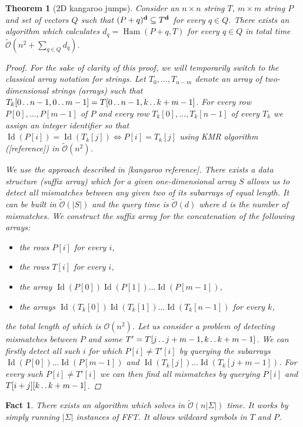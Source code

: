 \documentclass[11pt]{article}
\def\dd{\mathinner{.\,.}}
\renewcommand{\O}{\mathcal{O}}
\newcommand{\tO}{\tilde{\mathcal{O}}}
\DeclareMathOperator*{\Ham}{Ham}
\theoremstyle{plain}
\newtheorem{theorem}{Theorem}
\newtheorem{fact}{Fact}
\theoremstyle{definition}
\theoremstyle{remark}
\DeclareMathOperator*{\ID}{Id}
\begin{document}
\begin{theorem}[2D kangaroo jumps]\label{kangaroos}
	Consider an $n \times n$ string $T$, $m \times m$ string $P$ and set of vectors $Q$ such that $(P + q)^\mathbf{d} \subseteq T^\mathbf{d}$ for every $q \in Q$.
	There exists an algorithm which calculates $ d_q = \Ham(P + q, T) $ for every $q \in Q$ in total time $\tO(n^2 + \sum_{q \in Q} d_q)$.
	\begin{proof}
		For the sake of clarity of this proof, we will temporarily switch to the classical array notation for strings.
		Let $T_0, \dots, T_{n - m}$ denote an array of two-dimensional strings (arrays) such that $T_k[0 \dd n - 1, 0 \dd m - 1] = T[0 \dd n - 1, k \dd k + m - 1]$.
		For every row $P[0], \dots, P[m - 1]$ of $P$ and every row $T_k[0], \dots, T_k[n - 1]$ of every $T_k$ we assign an integer identifier so that $\ID(P[i]) = \ID(T_k[j]) \Leftrightarrow P[i] = T_k[j]$ using KMR algorithm ([reference]) in $\tO(n^2)$.
		
		We use the approach described in [kangaroo reference].
		There exists a data structure (suffix array) which for a given one-dimensional array $S$ allows us to detect all mismatches between any given two of its subarrays of equal length.
		It can be built in $\tO(|S|)$ and the query time is $\tO(d)$ where $d$ is the number of mismatches.
		We construct the suffix array for the concatenation of the following arrays:
		\begin{itemize}
			\item the rows $P[i]$ for every $i$,
			\item the rows $T[i]$ for every $i$,
			\item the array $\ID(P[0]) \ID(P[1]) \dots \ID(P[m - 1])$,
			\item the arrays $\ID(T_k[0]) \ID(T_k[1]) \dots \ID(T_k[n - 1])$ for every $k$,
		\end{itemize}
		the total length of which is $\O(n^2)$.
		Let us consider a problem of detecting mismatches between $P$ and some $T' = T[j \dd j + m - 1, k \dd k + m - 1]$.
		We can firstly detect all such $i$ for which $P[i] \neq T'[i]$ by querying the subarrays $\ID(P[0]) \dots \ID(P[m - 1])$ and $\ID(T_k[j]) \dots \ID(T_k[j + m - 1])$.
		For every such $P[i] \neq T'[i]$ we can then find all mismatches by querying $P[i]$ and $T[i + j][k \dd k + m - 1]$.
	\end{proof}
\end{theorem}


\begin{fact}\label{sigman1d}
	There exists an algorithm which solves \hd in $\tO(n|\Sigma|)$ time.
	It works by simply running $|\Sigma|$ instances of FFT.
	It allows wildcard symbols in $T$ and $P$.
\end{fact}
\end{document}
